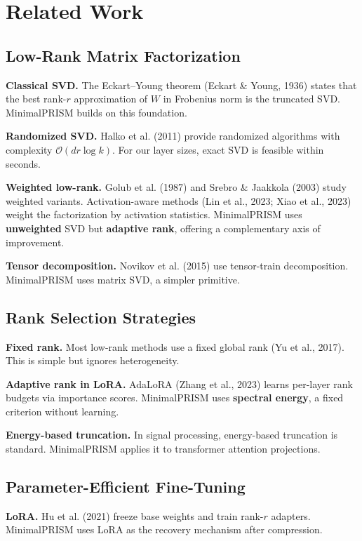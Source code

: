 
\section{Related Work}

\subsection{Low-Rank Matrix Factorization}

\textbf{Classical SVD.} The Eckart--Young theorem (Eckart \& Young, 1936) states 
that the best rank-$r$ approximation of $W$ in Frobenius norm is the 
truncated SVD. MinimalPRISM builds on this foundation.

\textbf{Randomized SVD.} Halko et al. (2011) provide randomized algorithms with 
complexity $\mathcal{O}(dr \log k)$. For our layer sizes, exact SVD is 
feasible within seconds.

\textbf{Weighted low-rank.} Golub et al. (1987) and Srebro \& Jaakkola (2003) study 
weighted variants. Activation-aware methods (Lin et al., 2023; Xiao et al., 
2023) weight the factorization by activation statistics. MinimalPRISM uses 
\textbf{unweighted} SVD but \textbf{adaptive rank}, offering a complementary axis of 
improvement.

\textbf{Tensor decomposition.} Novikov et al. (2015) use tensor-train 
decomposition. MinimalPRISM uses matrix SVD, a simpler primitive.

\subsection{Rank Selection Strategies}

\textbf{Fixed rank.} Most low-rank methods use a fixed global rank (Yu et al., 
2017). This is simple but ignores heterogeneity.

\textbf{Adaptive rank in LoRA.} AdaLoRA (Zhang et al., 2023) learns per-layer 
rank budgets via importance scores. MinimalPRISM uses \textbf{spectral energy}, a 
fixed criterion without learning.

\textbf{Energy-based truncation.} In signal processing, energy-based truncation 
is standard. MinimalPRISM applies it to transformer attention projections.

\subsection{Parameter-Efficient Fine-Tuning}

\textbf{LoRA.} Hu et al. (2021) freeze base weights and train rank-$r$ adapters. 
MinimalPRISM uses LoRA as the recovery mechanism after compression.

